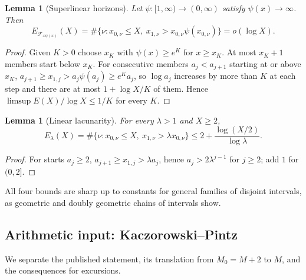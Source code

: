 \documentclass[11pt]{amsart}
\numberwithin{equation}{section}
\theoremstyle{plain}
\newtheorem{lemma}[theorem]{Lemma}
\theoremstyle{definition}
\theoremstyle{remark}
\newcommand{\F}{\mathcal{F}}
\begin{document}
\begin{lemma}[Superlinear horizons]
\label{lem:superlinear}
Let $\psi:[1,\infty)\to(0,\infty)$ satisfy $\psi(x)\to\infty$. Then
\[
E_{\F_{x\psi(x)}}(X)
=\#\{\nu:x_{0,\nu}\le X,\ x_{1,\nu}>x_{0,\nu}\psi(x_{0,\nu})\}
=o(\log X).
\]
\end{lemma}

\begin{proof}
Given $K>0$ choose $x_K$ with $\psi(x)\ge e^K$ for $x\ge x_K$. At most
$x_K+1$ members start below $x_K$. For consecutive members
$a_j<a_{j+1}$ starting at or above $x_K$,
$a_{j+1}\ge x_{1,j}>a_j\psi(a_j)\ge e^Ka_j$, so $\log a_j$ increases by more
than $K$ at each step and there are at most $1+\log X/K$ of them. Hence
$\limsup E(X)/\log X\le1/K$ for every $K$.
\end{proof}

\begin{lemma}[Linear lacunarity]
\label{lem:linear-lacunary}
For every $\lambda>1$ and $X\ge2$,
\begin{equation}
\label{eq:linear-lacunary-count}
E_\lambda(X)=\#\{\nu:x_{0,\nu}\le X,\ x_{1,\nu}>\lambda x_{0,\nu}\}
\le2+\frac{\log(X/2)}{\log\lambda}.
\end{equation}
\end{lemma}

\begin{proof}
For starts $a_j\ge2$, $a_{j+1}\ge x_{1,j}>\lambda a_j$, hence
$a_j>2\lambda^{j-1}$ for $j\ge2$; add $1$ for $(0,2]$.
\end{proof}

All four bounds are sharp up to constants for general families of disjoint
intervals, as geometric and doubly geometric chains of intervals show.

\subsection{Arithmetic input: Kaczorowski--Pintz}

We separate the published statement, its translation from $M_0=M+2$ to
$M$, and the consequences for excursions.
\end{document}

